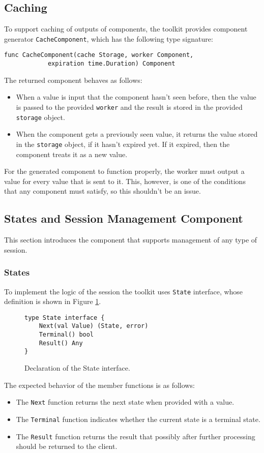 \subsection{Caching}
To support caching of outputs of components, the toolkit provides
component generator \texttt{CacheComponent}, which has the following type
signature:
\begin{lstlisting}
func CacheComponent(cache Storage, worker Component, 
            expiration time.Duration) Component
\end{lstlisting}
The returned component behaves as follows:
\begin{itemize}
  \item When a value is input that the component hasn't seen before, then
        the value is passed to the provided \texttt{worker} and the result 
        is stored in the provided \texttt{storage} object.

  \item When the component gets a previously seen value, it returns the value
        stored in the \texttt{storage} object, if it hasn't expired yet. If it 
        expired, then the component treats it as a new value.
\end{itemize}

For the generated component to function properly, the worker must output
a value for every value that is sent to it. This, however, is one of the 
conditions that any component must satisfy, so this shouldn't be an issue.

\subsection{States and Session Management Component}
This section introduces the component that supports management of any
type of session.
\subsubsection{States}
\label{sec:state}
To implement the logic of the session the toolkit uses \texttt{State}
interface, whose definition is shown in Figure \ref{fig:State}.
\begin{figure}[h]
\centering
\begin{lstlisting}
type State interface {
    Next(val Value) (State, error)
    Terminal() bool
    Result() Any
}
\end{lstlisting}
\caption[scale=1.0]{Declaration of the State interface.}
\label{fig:State}
\end{figure}
The expected behavior of the member functions is as follows:
\begin{itemize}
	\item The \texttt{Next} function returns the next state when provided 
          with a value.
	\item The \texttt{Terminal} function indicates whether the current 
          state is a terminal state.
	\item The \texttt{Result} function returns the result that possibly 
          after further processing should be returned to the client.
\end{itemize}

